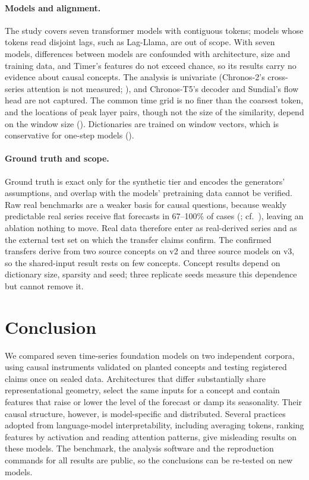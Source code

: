 \paragraph{Models and alignment.} The study covers seven transformer models with contiguous tokens; models whose tokens
read disjoint lags, such as Lag-Llama, are out of scope. With seven models, differences between models are confounded
with architecture, size and training data, and Timer's features do not exceed chance, so its results carry no evidence
about causal concepts. The analysis is univariate (Chronos-2's cross-series attention is not measured; ), and
Chronos-T5's decoder and Sundial's flow head are not captured. The common time grid is no finer than the coarsest token,
and the locations of peak layer pairs, though not the size of the similarity, depend on the window size (). Dictionaries are
trained on window vectors, which is conservative for one-step models ().

\paragraph{Ground truth and scope.} Ground truth is exact only for the synthetic tier and encodes the generators'
assumptions, and overlap with the models' pretraining data cannot be verified. Raw real benchmarks are a weaker basis for
causal questions, because weakly predictable real series receive flat forecasts in 67--100\% of cases (;
cf.\ \citealp{wan2026collapse}), leaving an ablation nothing to move. Real data therefore enter as real-derived series
and as the external test set on which the transfer claims confirm. The confirmed transfers derive from two source
concepts on v2 and three source models on v3, so the shared-input result rests on few concepts. Concept results depend
on dictionary size, sparsity and seed; three replicate seeds measure this dependence but cannot remove it.

\section{Conclusion}
\label{sec:conclusion}

We compared seven time-series foundation models on two independent corpora, using causal instruments validated on
planted concepts and testing registered claims once on sealed data. Architectures that differ substantially share
representational geometry, select the same inputs for a concept and contain features that raise or lower the level of
the forecast or damp its seasonality. Their causal structure, however, is model-specific and distributed. Several
practices adopted from language-model interpretability, including averaging tokens, ranking features by activation and
reading attention patterns, give misleading results on these models. The benchmark, the analysis software and the
reproduction commands for all results are public, so the conclusions can be re-tested on new models.

